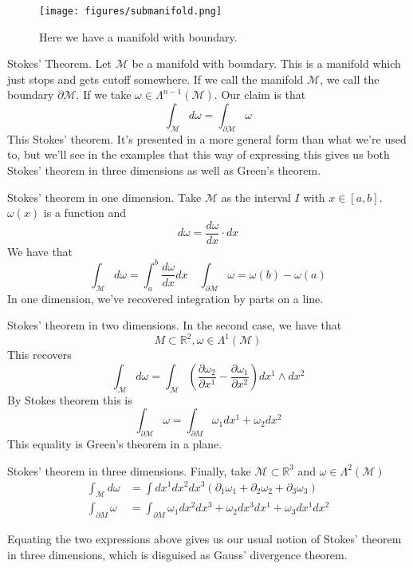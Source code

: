 \begin{figure}[h]
	\centering
	\texttt{[image: figures/submanifold.png]}
	\caption{Here we have a manifold with boundary.}%
\end{figure}

\begin{thm}{Stokes' Theorem.}
Let $ \mathcal{ M } $ be a manifold with boundary. 
This is a manifold which just stops and gets cutoff somewhere. 
If we call the manifold $ \mathcal{ M } $, we call the boundary 
$ \partial  \mathcal{ M }$. 
If we take $ \omega  \in \Lambda^{ n - 1} ( \mathcal{ M } ). $
Our claim is that
\[
\int_{ \mathcal{ M } } d \omega = \int_{ \partial  \mathcal{ M }} \omega
\] This Stokes' theorem. It's 
presented in a more general form 
than what we're used to, but we'll see in the 
examples that this way of expressing this 
gives us both Stokes' theorem in three dimensions 
as well as Green's theorem. 

\end{thm}

\begin{example}{Stokes' theorem in one dimension. } 
Take $ \mathcal{ M } $ as the interval $ I $ with $ x \in [ a, b ] $. 
$ \omega ( x)  $ is a function and 
\[
d \omega = \frac{ d \omega }{ dx  } \cdot  dx
\] We have that 
\[
\int_{ \mathcal{ M } } d \omega = \int_a^ b \frac{ d \omega }{ dx } dx \quad \int_{ \partial  \mathcal{ M } } \omega = \omega( b ) - \omega ( a) 
\] In one dimension, we've
recovered integration by 
parts on a line. 

\end{example}

\begin{example}{Stokes' theorem in two dimensions. } 
In the second case, we have that 
\[
M \subset \mathbb{ R} ^ 2, \omega \in \Lambda^ 1 ( \mathcal{ M } ) 
\] This recovers 
\[
\int_{ \mathcal{ M } } d \omega = \int_{ \mathcal{ M } } \left( \frac{\partial \omega_2 }{\partial  x^ 1 }  - \frac{\partial  \omega_1 }{\partial  x^ 2}  \right) dx^ 1 \wedge  dx^2  
\] By Stokes theorem this is 
\[
\int_{ \partial  \mathcal{ M  } } \omega = \int_{ \partial  M } \omega_1 dx^ 1 + \omega_2 dx^ 2  
\] This equality is Green's theorem in a plane. 

\end{example}

\begin{example}{Stokes' theorem in three dimensions.} 
Finally, take $ \mathcal{ M } \subset \mathbb{ R}^ 3 $ and $ \omega \in \Lambda^ 2 ( \mathcal{ M } ) $
\begin{align*}
\int_{ \mathcal{ M } } d \omega & = \int dx^ 1 dx^ 2 dx^ 3 ( \partial_1 \omega_1 + \partial_2 \omega_2 + \partial  _ 3 \omega _ 3 ) \\
\int_{ \partial  M   } \omega  &= \int_{ \partial  M  } \omega_1 dx^ 2 dx^ 3 + \omega_ 2 dx^ 3 dx^ 1 + \omega_3 dx^ 1 dx^ 2 
\end{align*}

Equating the two expressions above 
gives us our usual notion of Stokes' theorem in three dimensions, which 
is disguised as Gauss' divergence theorem. 
\end{example}

\pagebreak 
